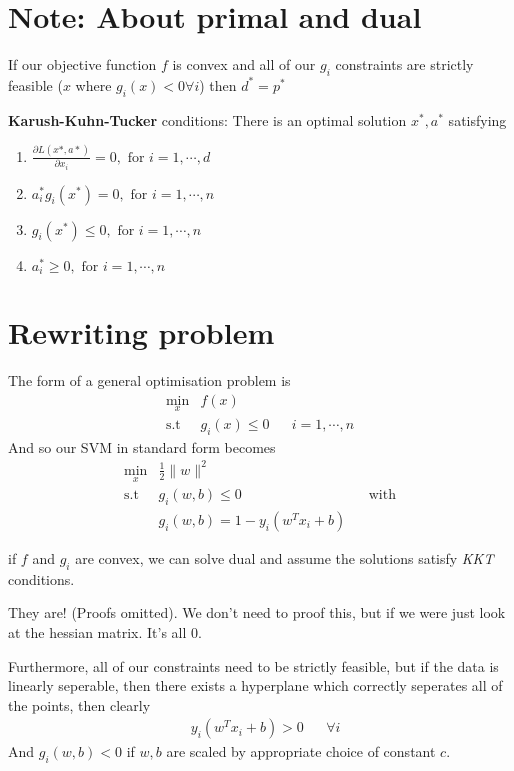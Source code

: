 \documentclass{article}
\begin{document}
  
  \section{Note: About primal and dual}
    If our objective function $f$ is convex and all of our $g_i$ constraints are strictly feasible ($x$ where $g_i(x) < 0 \forall i$) then $d^* = p^*$

    \textbf{Karush-Kuhn-Tucker} conditions:
    There is an optimal solution $x^*, a^*$ satisfying
    \begin{enumerate}
      \item $\frac{\partial L(x*, a*)}{\partial x_i} = 0, \text{ for } i = 1, \cdots, d$
      \item $a_i^* g_i(x^*) = 0, \text{ for } i = 1, \cdots, n$
      \item $g_i(x^*) \leq 0, \text{ for } i = 1, \cdots, n$
      \item $a_i^* \geq 0, \text{ for } i = 1, \cdots, n$
    \end{enumerate}

\section{Rewriting problem}
    The form of a general optimisation problem is
    \begin{align}
      \min_x & f(x) \\
      \text{s.t } & g_i(x) \leq 0 && i = 1, \cdots, n
    \end{align}
    And so our SVM in standard form becomes
    \begin{align}
      \min_x & \frac{1}{2}\lVert w \rVert^2 \\
      \text{s.t } & g_i(w, b) \leq 0 && \text{with} \\
       & g_i(w, b) = 1 - y_i(w^T x_i + b)
    \end{align}

    if $f$ and $g_i$ are convex, we can solve dual and assume the solutions satisfy \emph{KKT} conditions. 

    They are! (Proofs omitted). We don't need to proof this, but if we were just look at the hessian matrix. It's all $0$.

    Furthermore, all of our constraints need to be strictly feasible, but if the data is linearly seperable, then there exists a hyperplane which correctly seperates all of the points, then clearly
    \begin{align}
      & y_i(w^Tx_i + b) > 0 && \forall i
    \end{align}
    And $g_i(w, b) < 0$ if $w, b$ are scaled by appropriate choice of constant $c$. 
\end{document}
